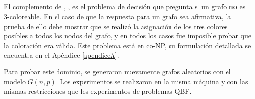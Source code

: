 \subsection{\coCOL}
El complemento de \TCOL, \coCOL, es el problema de decisión que pregunta si un
grafo \textbf{no} es 3-coloreable. En el caso de que la respuesta para un grafo
sea afirmativa, la prueba de ello debe mostrar que se realizó la asignación de
los tres colores posibles a todos los nodos del grafo, y en todos los casos
fue imposible probar que la coloración era válida. Este problema está en co-NP,
su formulación detallada se encuentra en el Apéndice \ref{apendiceA}.

Para probar este dominio, se generaron nuevamente grafos aleatorios con el modelo
$G(n,p)$. Los experimentos se realizaron en la misma máquina y con las
mismas restricciones que los experimentos de problemas QBF.

